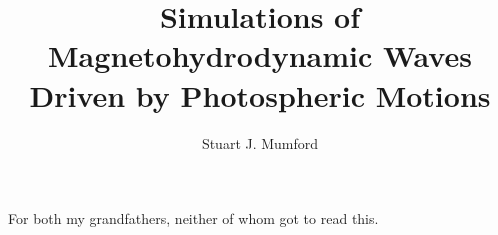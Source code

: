 \documentclass[a4paper,12pt,fourier,authoryear,custommargin]{Classes/PhDThesisPSnPDF}
\title{Simulations of Magnetohydrodynamic Waves Driven by Photospheric Motions}
\author{Stuart J. Mumford}
\begin{document}
\frontmatter

\begin{titlepage}

\maketitle

\end{titlepage}

%
\clearpage{}%

\begin{dedication}

For both my grandfathers, neither of whom got to read this.

\end{dedication}
\clearpage{}%
%

%
%
\clearpage{}%
\end{document}
